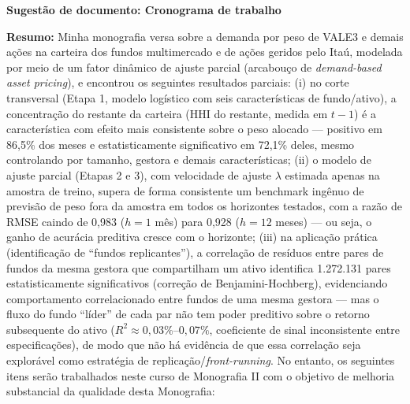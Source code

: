 \documentclass[12pt]{article}
\begin{document}
\begin{center}
\large\bfseries Sugestão de documento: Cronograma de trabalho
\end{center}

\vspace{0.5cm}

\noindent\textbf{Resumo:} Minha monografia versa sobre a demanda por peso de VALE3 e demais
ações na carteira dos fundos multimercado e de ações geridos pelo Itaú, modelada por meio de um
fator dinâmico de ajuste parcial (arcabouço de \emph{demand-based asset pricing}), e encontrou os
seguintes resultados parciais: (i) no corte transversal (Etapa 1, modelo logístico com seis
características de fundo/ativo), a concentração do restante da carteira (HHI do restante, medida
em $t-1$) é a característica com efeito mais consistente sobre o peso alocado --- positivo em
86,5\% dos meses e estatisticamente significativo em 72,1\% deles, mesmo controlando por tamanho,
gestora e demais características; (ii) o modelo de ajuste parcial (Etapas 2 e 3), com velocidade
de ajuste $\lambda$ estimada apenas na amostra de treino, supera de forma consistente um
benchmark ingênuo de previsão de peso fora da amostra em todos os horizontes testados, com a
razão de RMSE caindo de 0,983 ($h=1$ mês) para 0,928 ($h=12$ meses) --- ou seja, o ganho de
acurácia preditiva cresce com o horizonte; (iii) na aplicação prática (identificação de ``fundos
replicantes''), a correlação de resíduos entre pares de fundos da mesma gestora que compartilham
um ativo identifica 1.272.131 pares estatisticamente significativos (correção de
Benjamini-Hochberg), evidenciando comportamento correlacionado entre fundos de uma mesma gestora
--- mas o fluxo do fundo ``líder'' de cada par não tem poder preditivo sobre o retorno subsequente
do ativo ($R^2 \approx 0{,}03\%$--$0{,}07\%$, coeficiente de sinal inconsistente entre
especificações), de modo que não há evidência de que essa correlação seja explorável como
estratégia de replicação/\emph{front-running}. No entanto, os seguintes itens serão trabalhados
neste curso de Monografia II com o objetivo de melhoria substancial da qualidade desta
Monografia:
\end{document}
